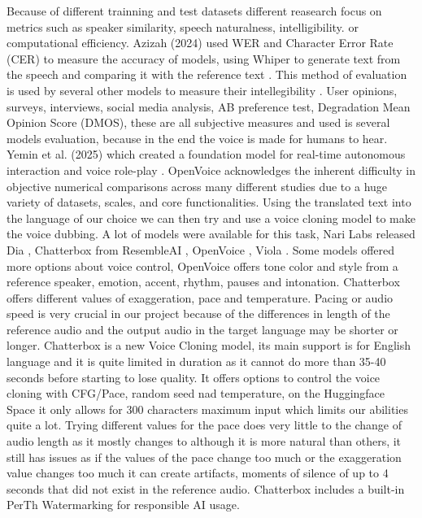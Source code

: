 \documentclass[12pt]{article}
\begin{document}
Because of different trainning and test datasets different reasearch focus on metrics such as speaker similarity, speech naturalness, intelligibility. or computational efficiency. Azizah (2024) used WER and Character Error Rate (CER) to measure the accuracy of models, using Whiper to generate text from the speech and comparing it with the reference text \cite{zero-shot-voice-cloning}. This method of evaluation is used by several other models to measure their intellegibility \cite{harminizaion-of-voice-cloning}\cite{chen2021v2cvisualvoicecloning}\cite{NAUTILUS}\cite{zero-shot-voice-cloning}. User opinions, surveys, interviews, social media analysis, AB preference test, Degradation Mean Opinion Score (DMOS), these are all subjective measures and used is several models evaluation, because in the end the voice is made for humans to hear. Yemin et al. (2025) which created a foundation model for real-time autonomous interaction and voice role-play \cite{viola-voice-role-play}. OpenVoice acknowledges the inherent difficulty in objective numerical comparisons across many different studies due to a huge variety of datasets, scales, and core functionalities. Using the translated text into the language of our choice we can then try and use a voice cloning model to make the voice dubbing. A lot of models were available for this task, Nari Labs released Dia \cite{Dia}, Chatterbox from ResembleAI \cite{chatterbox}, OpenVoice \cite{openvoice}, Viola \cite{viola-voice-role-play}. Some models offered more options about voice control, OpenVoice offers tone color and style from a reference speaker, emotion, accent, rhythm, pauses and intonation. Chatterbox offers different values of exaggeration, pace and temperature. Pacing or audio speed is very crucial in our project because of the differences in length of the reference audio and the output audio in the target language may be shorter or longer. Chatterbox is a new Voice Cloning model, its main support is for English language and it is quite limited in duration as it cannot do more than 35-40 seconds before starting to lose quality. It offers options to control the voice cloning with CFG/Pace, random seed nad temperature, on the Huggingface Space it only allows for 300 characters maximum input which limits our abilities quite a lot. Trying different values for the pace does very little to the change of audio length as it mostly changes to although it is more natural than others, it still has issues as if the values of the pace change too much or the exaggeration value changes too much it can create artifacts, moments of silence of up to 4 seconds that did not exist in the reference audio. Chatterbox includes a built-in PerTh Watermarking for responsible AI usage.  
\end{document}
